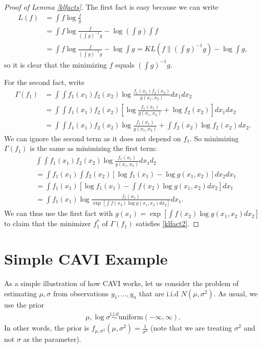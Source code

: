 \documentclass{scrartcl}
\begin{document}
\begin{proof}[Proof of Lemma \ref{klfacts}]
  The first fact is easy because we can write
  \begin{align*}
    L(f) &= \int f \log \frac{f}{g} \\ &= \int f \log \frac{f}{(\int
      g)^{-1} g} - \log (\int g) \int f \\ &= \int f \log \frac{f}{(\int
      g)^{-1} g} - \log \int g = KL(f \| (\int g)^{-1} g) - \log \int
                                         g, 
  \end{align*}
  so it is clear that the minimizing $f$ equals $(\int g)^{-1} g$.

  For the second fact, write
  \begin{align*}
    \Gamma(f_1) &= \int \int f_1(x_1) f_2(x_2) \log
                  \frac{f_1(x_1)f_2(x_2)}{g(x_1, x_2)} dx_1 dx_2  \\
    &= \int \int f_1(x_1) f_2(x_2) \left[\log
      \frac{f_1(x_1)}{g(x_1, x_2)} + \log f_2(x_2) \right] dx_1 dx_2 \\
    &= \int \int f_1(x_1) f_2(x_2) \log
      \frac{f_1(x_1)}{g(x_1, x_2)} + \int f_2(x_2) \log f_2(x_2)
      dx_2. 
  \end{align*}
  We can ignore the second term as it does not depend on $f_1$. So
  minimizing $\Gamma(f_1)$ is the same as minimizing the first term: 
  \begin{align*}
    &  \int \int f_1(x_1) f_2(x_2) \log \frac{f_1(x_1)}{g(x_1, x_2)}
      dx_1 d_2 \\
    &= \int f_1(x_1) \int f_2(x_2) \left[\log f_1(x_1) - \log g(x_1,
      x_2) \right] dx_2 dx_1 \\
    &= \int f_1(x_1) \left[\log f_1(x_1) - \int f(x_2) \log g(x_1,
      x_2) dx_2 \right] dx_1 \\
    &= \int f_1(x_1) \log \frac{f_1(x_1)}{\exp \left[\int f(x_2) \log
      g(x_1, x_2) dx_2 \right]} dx_1. 
  \end{align*}
  We can thus use the first fact with $g(x_1) = \exp \left[ \int f(x_2) \log
      g(x_1, x_2) dx_2\right]$ to claim that the minimizer $f_1^*$ of
    $\Gamma(f_1)$ satisfies \eqref{klfact2}. 
\end{proof}

\section{Simple CAVI Example}

As a simple illustration of how CAVI works, let us consider the
problem of estimating $\mu, \sigma$ from observations $y_1,
\dots, y_n$ that are i.i.d $N(\mu, \sigma^2)$. As usual, we use the
prior
\begin{align*}
  \mu, \log \sigma \overset{\text{i.i.d}}{\sim}
  \text{uniform}(-\infty, \infty). 
\end{align*}
In other words, the prior is $f_{\mu, \sigma^2}(\mu,
\sigma^2)=\frac{1}{\sigma^2}$ (note that we are treating $\sigma^2$
and not $\sigma$ as the parameter).
\end{document}
